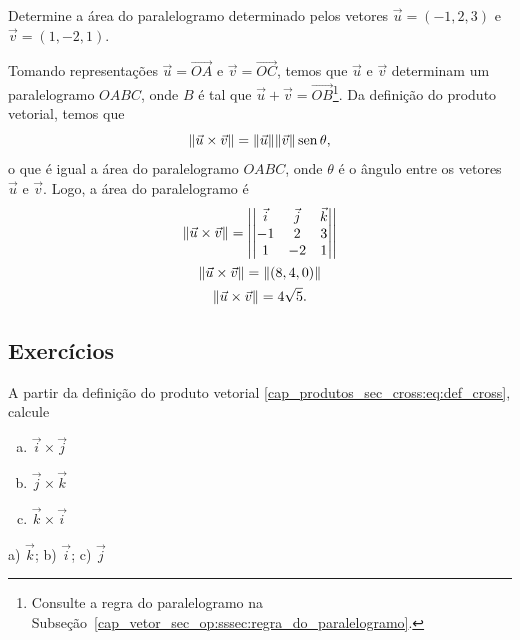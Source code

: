 \begin{exeresol}
  Determine a área do paralelogramo determinado pelos vetores $\vec{u} = (-1, 2, 3)$ e $\vec{v} = (1,-2,1)$.
\end{exeresol}
\begin{resol}
  Tomando representações $\vec{u}=\overrightarrow{OA}$ e $\vec{v}=\overrightarrow{OC}$, temos que $\vec{u}$ e $\vec{v}$ determinam um paralelogramo $OABC$, onde $B$ é tal que $\vec{u}+\vec{v}=\overrightarrow{OB}$\footnote{Consulte a regra do paralelogramo na Subseção~\ref{cap_vetor_sec_op:sssec:regra_do_paralelogramo}.}. Da definição do produto vetorial, temos que
  \begin{equation}
    \|\vec{u}\times\vec{v}\| = \|\vec{u}\|\|\vec{v}\|\operatorname{sen}\theta,
  \end{equation}
  o que é igual a área do paralelogramo $OABC$, onde $\theta$ é o ângulo entre os vetores $\vec{u}$ e $\vec{v}$. Logo, a área do paralelogramo é
  \begin{gather}
    \|\vec{u}\times\vec{v}\| =
    \left|\begin{vmatrix}
      \vec{i} & \vec{j} & \vec{k} \\
      -1 & 2 & 3 \\
      1 & -2 & 1
    \end{vmatrix}\right|\\
    \|\vec{u}\times\vec{v}\| = \|(8,4,0)\|\\
    \|\vec{u}\times\vec{v}\| = 4\sqrt{5}.
  \end{gather}
\end{resol}

\subsection{Exercícios}

\begin{exer}\label{cap_produtos_sec_cross:exer:ijk}
  A partir da definição do produto vetorial \eqref{cap_produtos_sec_cross:eq:def_cross}, calcule
  \begin{enumerate}[a)]
    \item $\vec{i}\times\vec{j}$
    \item $\vec{j}\times\vec{k}$
    \item $\vec{k}\times\vec{i}$
  \end{enumerate}
\end{exer}
\begin{resp}
  a) $\vec{k}$; b) $\vec{i}$; c) $\vec{j}$
\end{resp}

